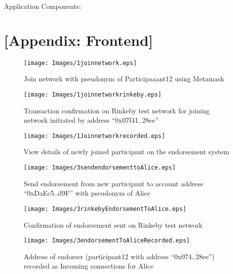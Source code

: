 


Application Components: 







\chapter{[Appendix: Frontend] } \label{frontend}
\label{ch:appendixd}

\vspace*{-1em}

\begin{figure}[H]
	\centering
	\texttt{[image: Images/1joinnetwork.eps]}
	\caption{Join network with pseudonym of Participaaant12 using Metamask}
\end{figure}
\begin{figure}
	\centering
	\texttt{[image: Images/1joinnetworkrinkeby.eps]}
	\caption{Transaction confirmation on Rinkeby test network for joining network initiated by address ``0x07f41..28ee'' }
\end{figure}
\begin{figure}
	\centering
	\texttt{[image: Images/1Joinnetworkrecorded.eps]}
	\caption{View details of newly joined participant on the endorsement system}
\end{figure}
\begin{figure}
	\centering
	\texttt{[image: Images/3sendendorsementtoAlice.eps]}
	\caption{Send endorsement from new participant to account address ``0xDaEc5..d9F'' with pseudonym of Alice}
\end{figure}
\begin{figure}
	\centering
	\texttt{[image: Images/3rinkebyEndorsementToAlice.eps]}
	\caption{Confirmation of endorsement sent on Rinkeby test network}
\end{figure}
\begin{figure}[H]
	\centering
	\texttt{[image: Images/3endorsementToAliceRecorded.eps]}
	\caption{Address of endorser (participant12 with address ``0x074..28ee'') recorded as Incoming connections for Alice}
\end{figure}

\endgroup
